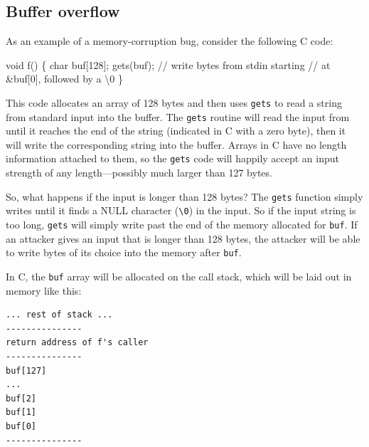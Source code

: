 \documentclass[
  letterpaper,
]{scrbook}
\newenvironment{Shaded}{\begin{snugshade}}{\end{snugshade}}
\newcommand{\CommentTok}[1]{\textcolor[rgb]{0.37,0.37,0.37}{#1}}
\newcommand{\DataTypeTok}[1]{\textcolor[rgb]{0.68,0.00,0.00}{#1}}
\newcommand{\DecValTok}[1]{\textcolor[rgb]{0.68,0.00,0.00}{#1}}
\newcommand{\NormalTok}[1]{\textcolor[rgb]{0.00,0.23,0.31}{#1}}
\newcommand{\OperatorTok}[1]{\textcolor[rgb]{0.37,0.37,0.37}{#1}}
\theoremstyle{definition}
\theoremstyle{plain}
\theoremstyle{plain}
\theoremstyle{remark}
\begin{document}
\subsection{Buffer overflow}\label{buffer-overflow}

As an example of a memory-corruption bug, consider the following C code:

\begin{Shaded}
\begin{Highlighting}[]
\DataTypeTok{void}\NormalTok{ f}\OperatorTok{()} \OperatorTok{\{}
    \DataTypeTok{char}\NormalTok{ buf}\OperatorTok{[}\DecValTok{128}\OperatorTok{];}
\NormalTok{    gets}\OperatorTok{(}\NormalTok{buf}\OperatorTok{);} \CommentTok{// write bytes from stdin starting}
           \CommentTok{// at \&buf[0], followed by a \textquotesingle{}\textbackslash{}0\textquotesingle{}}
\OperatorTok{\}}
\end{Highlighting}
\end{Shaded}

This code allocates an array of 128 bytes and then uses \texttt{gets} to
read a string from standard input into the buffer. The \texttt{gets}
routine will read the input from until it reaches the end of the string
(indicated in C with a zero byte), then it will write the corresponding
string into the buffer. Arrays in C have no length information attached
to them, so the \texttt{gets} code will happily accept an input strength
of any length---possibly much larger than 127 bytes.

So, what happens if the input is longer than 128 bytes? The
\texttt{gets} function simply writes until it finds a NULL character
(\texttt{\textquotesingle{}\textbackslash{}0\textquotesingle{}}) in the
input. So if the input string is too long, \texttt{gets} will simply
write past the end of the memory allocated for \texttt{buf}. If an
attacker gives an input that is longer than 128 bytes, the attacker will
be able to write bytes of its choice into the memory after \texttt{buf}.

In C, the \texttt{buf} array will be allocated on the call stack, which
will be laid out in memory like this:

\begin{verbatim}
... rest of stack ...
---------------
return address of f's caller
---------------
buf[127]
...
buf[2]
buf[1]
buf[0]
---------------
\end{verbatim}

\end{document}
